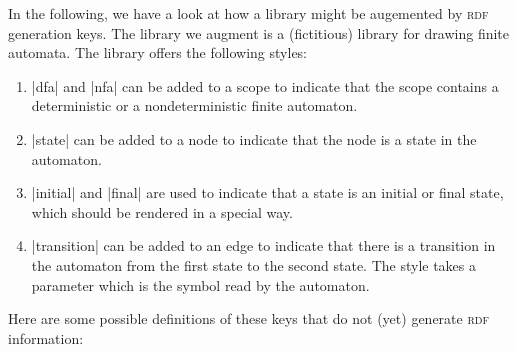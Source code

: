 In the following, we have a look at how a library might be augemented
by \textsc{rdf} generation keys. The library we augment is a
(fictitious) library for drawing finite automata. The library offers
the following styles:
\begin{enumerate}
\item |dfa| and |nfa| can be added to a scope to indicate that the
  scope contains a deterministic or a nondeterministic finite
  automaton.
\item |state| can be added to a node to indicate that the node is a
  state in the automaton.
\item |initial| and |final| are used to indicate that a state is an
  initial or final state,   which should be rendered in a special way.
\item |transition| can be added to an edge to indicate that there is
  a transition in the automaton from the first state to the second
  state. The style takes a parameter which is the symbol read by the
  automaton. 
\end{enumerate}

Here are some possible definitions of these keys that do not (yet)
generate \textsc{rdf} information:

\begin{codeexample}
\end{codeexample}






\endinput



